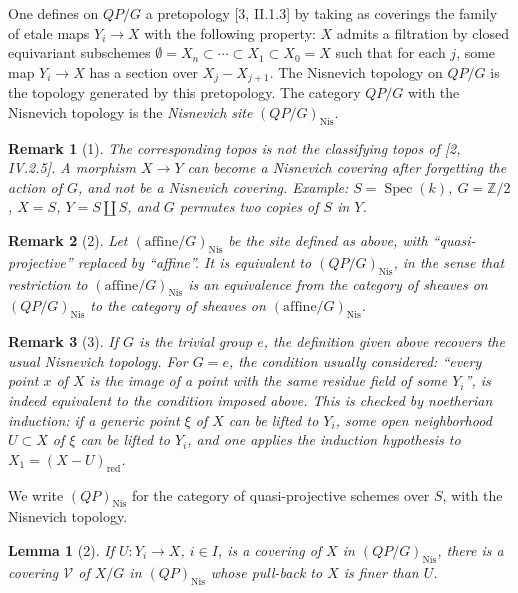 \documentclass[11pt]{article}
\newcommand{\Z}{\mathbb Z}
\newcommand{\Nis}{\mathrm{Nis}}
\newcommand{\Spec}{\operatorname{Spec}}
\newcommand{\red}{\mathrm{red}}
\theoremstyle{deligne}
\newtheorem*{lemma*}{Lemma}
\newtheorem*{remark*}{Remark}
\begin{document}
One defines on \(QP/G\) a pretopology [3, II.1.3] by taking as coverings the family of etale maps \(Y_i\to X\) with the following property: \(X\) admits a filtration by closed equivariant subschemes \(\emptyset=X_n\subset\cdots\subset X_1\subset X_0=X\) such that for each \(j\), some map \(Y_i\to X\) has a section over \(X_j-X_{j+1}\). The Nisnevich topology on \(QP/G\) is the topology generated by this pretopology. The category \(QP/G\) with the Nisnevich topology is the \emph{Nisnevich site} \((QP/G)_{\Nis}\).

\begin{remark*}[1]
The corresponding topos is not the classifying topos of [2, IV.2.5]. A morphism \(X\to Y\) can become a Nisnevich covering after forgetting the action of \(G\), and not be a Nisnevich covering. Example: \(S=\Spec(k)\), \(G=\Z/2\), \(X=S\), \(Y=S\coprod S\), and \(G\) permutes two copies of \(S\) in \(Y\).
\end{remark*}

\begin{remark*}[2]
Let \((\mathrm{affine}/G)_{\Nis}\) be the site defined as above, with ``quasi-projective'' replaced by ``affine''. It is equivalent to \((QP/G)_{\Nis}\), in the sense that restriction to \((\mathrm{affine}/G)_{\Nis}\) is an equivalence from the category of sheaves on \((QP/G)_{\Nis}\) to the category of sheaves on \((\mathrm{affine}/G)_{\Nis}\).
\end{remark*}

\begin{remark*}[3]
If \(G\) is the trivial group \(e\), the definition given above recovers the usual Nisnevich topology. For \(G=e\), the condition usually considered: ``every point \(x\) of \(X\) is the image of a point with the same residue field of some \(Y_i\)'', is indeed equivalent to the condition imposed above. This is checked by noetherian induction: if a generic point \(\xi\) of \(X\) can be lifted to \(Y_i\), some open neighborhood \(U\subset X\) of \(\xi\) can be lifted to \(Y_i\), and one applies the induction hypothesis to \(X_1=(X-U)_{\red}\).
\end{remark*}

We write \((QP)_{\Nis}\) for the category of quasi-projective schemes over \(S\), with the Nisnevich topology.

\begin{lemma*}[2]
If \(U:Y_i\to X\), \(i\in I\), is a covering of \(X\) in \((QP/G)_{\Nis}\), there is a covering \(\mathcal V\) of \(X/G\) in \((QP)_{\Nis}\) whose pull-back to \(X\) is finer than \(U\).
\end{lemma*}
\end{document}
